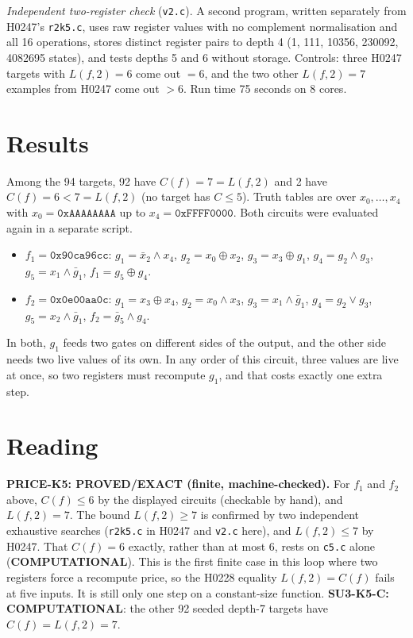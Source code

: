 \documentclass[11pt]{article}
\begin{document}
\emph{Independent two-register check} (\texttt{v2.c}). A second program, written separately from H0247's \texttt{r2k5.c}, uses raw register values with no complement normalisation and all 16 operations, stores distinct register pairs to depth 4 (1, 111, 10356, 230092, 4082695 states), and tests depths 5 and 6 without storage. Controls: three H0247 targets with $L(f,2)=6$ come out $=6$, and the two other $L(f,2)=7$ examples from H0247 come out $>6$. Run time 75 seconds on 8 cores.

\section*{Results}
Among the 94 targets, 92 have $C(f)=7=L(f,2)$ and 2 have $C(f)=6<7=L(f,2)$ (no target has $C\le5$). Truth tables are over $x_0,\dots,x_4$ with $x_0=\texttt{0xAAAAAAAA}$ up to $x_4=\texttt{0xFFFF0000}$. Both circuits were evaluated again in a separate script.
\begin{itemize}
\item $f_1=\texttt{0x90ca96cc}$: $g_1=\bar x_2\wedge x_4$, $g_2=x_0\oplus x_2$, $g_3=x_3\oplus g_1$, $g_4=g_2\wedge g_3$, $g_5=x_1\wedge\bar g_1$, $f_1=g_5\oplus g_4$.
\item $f_2=\texttt{0x0e00aa0c}$: $g_1=x_3\oplus x_4$, $g_2=x_0\wedge x_3$, $g_3=x_1\wedge\bar g_1$, $g_4=g_2\vee g_3$, $g_5=x_2\wedge\bar g_1$, $f_2=\bar g_5\wedge g_4$.
\end{itemize}
In both, $g_1$ feeds two gates on different sides of the output, and the other side needs two live values of its own. In any order of this circuit, three values are live at once, so two registers must recompute $g_1$, and that costs exactly one extra step.

\section*{Reading}
\textbf{PRICE-K5: PROVED/EXACT (finite, machine-checked).} For $f_1$ and $f_2$ above, $C(f)\le6$ by the displayed circuits (checkable by hand), and $L(f,2)=7$. The bound $L(f,2)\ge7$ is confirmed by two independent exhaustive searches (\texttt{r2k5.c} in H0247 and \texttt{v2.c} here), and $L(f,2)\le7$ by H0247. That $C(f)=6$ exactly, rather than at most 6, rests on \texttt{c5.c} alone (\textbf{COMPUTATIONAL}). This is the first finite case in this loop where two registers force a recompute price, so the H0228 equality $L(f,2)=C(f)$ fails at five inputs. It is still only one step on a constant-size function. \textbf{SU3-K5-C: COMPUTATIONAL}: the other 92 seeded depth-7 targets have $C(f)=L(f,2)=7$.
\end{document}
